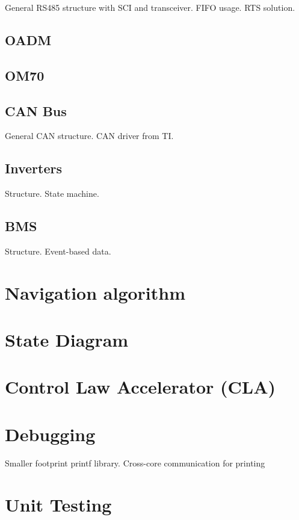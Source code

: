 General RS485 structure with SCI and transceiver. FIFO usage. RTS solution.

\subsection{OADM}

\subsection{OM70}

\subsection{CAN Bus}

General CAN structure. CAN driver from TI.

\subsection{Inverters}

Structure. State machine.

\subsection{BMS}

Structure. Event-based data.

\section{Navigation algorithm}

\section{State Diagram}

\section{Control Law Accelerator (CLA)}

\section{Debugging}

Smaller footprint printf library. Cross-core communication for printing

\section{Unit Testing}

